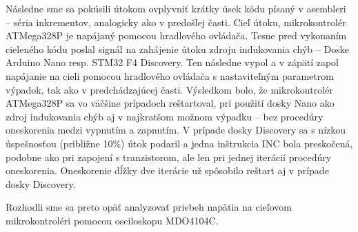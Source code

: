 Následne sme sa pokúsili útokom ovplyvniť krátky úsek kódu písaný v asembleri -- séria inkrementov, analogicky ako v predošlej časti. Cieľ útoku, mikrokontrolér ATMega328P je napájaný pomocou hradlového ovládača. Tesne pred vykonaním cieleného kódu poslal signál na zahájenie útoku zdroju indukovania chýb -- Doske Arduino Nano resp. STM32 F4 Discovery. Ten následne vypol a v zápätí zapol napájanie na cieli pomocou hradlového ovládača s nastaviteľným parametrom výpadok, tak ako v predchádzajúcej časti. Výsledkom bolo, že mikrokontrolér ATMega328P sa vo väčšine prípadoch reštartoval, pri použití dosky Nano ako zdroj indukovania chýb aj v najkratšom možnom výpadku -- bez procedúry oneskorenia medzi vypnutím a zapnutím. V prípade dosky Discovery sa s nízkou úspešnosťou (približne 10\%) útok podaril a jedna inštrukcia INC bola preskočená, podobne ako pri zapojení s tranzistorom, ale len pri jednej iterácií procedúry oneskorenia. Oneskorenie dĺžky dve iterácie už spôsobilo reštart aj v prípade dosky Discovery.

Rozhodli sme sa preto opäť analyzovať priebeh napätia na cieľovom mikrokontroléri pomocou osciloskopu MDO4104C.
